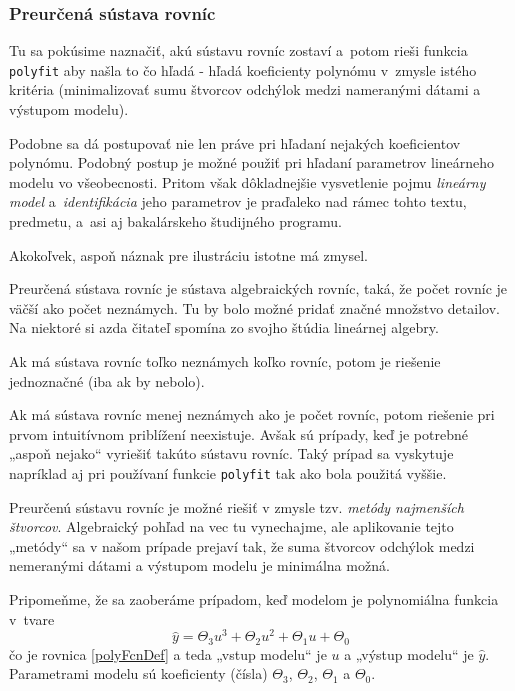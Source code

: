 \documentclass[a4paper, 10pt, ]{article}
\begin{document}
\subsubsection{Preurčená sústava rovníc}

Tu sa pokúsime naznačiť, akú sústavu rovníc zostaví a~potom rieši funkcia \verb|polyfit| aby našla to čo hľadá - hľadá koeficienty polynómu v~zmysle istého kritéria (minimalizovať sumu štvorcov odchýlok medzi nameranými dátami a výstupom modelu).

Podobne sa dá postupovať nie len práve pri hľadaní nejakých koeficientov polynómu. Podobný postup je možné použiť pri hľadaní parametrov lineárneho modelu vo všeobecnosti. Pritom však dôkladnejšie vysvetlenie pojmu \emph{lineárny model} a~\emph{identifikácia} jeho parametrov je praďaleko nad rámec tohto textu, predmetu, a~asi aj bakalárskeho študijného programu.

Akokoľvek, aspoň náznak pre ilustráciu istotne má zmysel.


Preurčená sústava rovníc je sústava algebraických rovníc, taká, že počet rovníc je väčší ako počet neznámych. Tu by bolo možné pridať značné množstvo detailov. Na niektoré si azda čitateľ spomína zo svojho štúdia lineárnej algebry.

Ak má sústava rovníc toľko neznámych koľko rovníc, potom je riešenie jednoznačné (iba ak by nebolo).

Ak má sústava rovníc menej neznámych ako je počet rovníc, potom riešenie pri prvom intuitívnom priblížení neexistuje. Avšak sú prípady, keď je potrebné „aspoň nejako“ vyriešiť takúto sústavu rovníc. Taký prípad sa vyskytuje napríklad aj pri používaní funkcie \verb|polyfit| tak ako bola použitá vyššie.

Preurčenú sústavu rovníc je možné riešiť v zmysle tzv. \emph{metódy najmenších štvorcov}. Algebraický pohľad na vec tu vynechajme, ale aplikovanie tejto „metódy“ sa v našom prípade prejaví tak, že suma štvorcov odchýlok medzi nemeranými dátami a výstupom modelu je minimálna možná.




\bigskip

Pripomeňme, že sa zaoberáme prípadom, keď modelom je polynomiálna funkcia v~tvare
\begin{equation}
    \hat y = \Theta_3 u^3 + \Theta_2 u^2 + \Theta_1 u + \Theta_0
\end{equation}
čo je rovnica \eqref{polyFcnDef} a teda „vstup modelu“ je $u$ a „výstup modelu“ je $\hat y$. Parametrami modelu sú koeficienty (čísla) $\Theta_3$, $\Theta_2$, $\Theta_1$ a $\Theta_0$.
\end{document}
